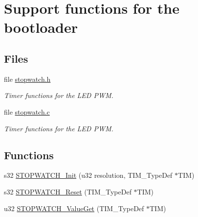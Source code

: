 \hypertarget{group___bootloader_support}{\section{\-Support functions for the bootloader}
\label{group___bootloader_support}
}
\subsection*{\-Files}
\begin{DoxyCompactItemize}
\item 
file \hyperlink{stopwatch_8h}{stopwatch.\-h}
\begin{DoxyCompactList}\small\item\em \-Timer functions for the \-L\-E\-D \-P\-W\-M. \end{DoxyCompactList}\item 
file \hyperlink{stopwatch_8c}{stopwatch.\-c}
\begin{DoxyCompactList}\small\item\em \-Timer functions for the \-L\-E\-D \-P\-W\-M. \end{DoxyCompactList}\end{DoxyCompactItemize}
\subsection*{\-Functions}
\begin{DoxyCompactItemize}
\item 
s32 \hyperlink{group___bootloader_support_ga0561a1773f7b6182e0b62e190b2b19fc}{\-S\-T\-O\-P\-W\-A\-T\-C\-H\-\_\-\-Init} (u32 resolution, \-T\-I\-M\-\_\-\-Type\-Def $\ast$\-T\-I\-M)
\item 
s32 \hyperlink{group___bootloader_support_ga92960ea5267b4ba57c79336ff857593d}{\-S\-T\-O\-P\-W\-A\-T\-C\-H\-\_\-\-Reset} (\-T\-I\-M\-\_\-\-Type\-Def $\ast$\-T\-I\-M)
\item 
u32 \hyperlink{group___bootloader_support_ga760ab9a9c21f1d4c22b14884c985e20f}{\-S\-T\-O\-P\-W\-A\-T\-C\-H\-\_\-\-Value\-Get} (\-T\-I\-M\-\_\-\-Type\-Def $\ast$\-T\-I\-M)
\end{DoxyCompactItemize}


